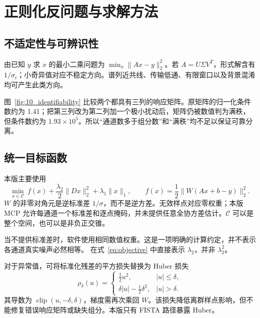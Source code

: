 \chapter{正则化反问题与求解方法}
\section{不适定性与可辨识性}
由已知 $y$ 求 $x$ 的最小二乘问题为 $\min_x\|Ax-y\|_2^2$。若 $A=U\Sigma V^T$，形式解含有 $1/\sigma_i$；小奇异值对应不稳定方向。谱列近共线、传输低通、有限窗口以及背景混淆均可产生此类方向。

图~\ref{fig:10_identifiability} 比较两个都具有三列的响应矩阵。原矩阵的归一化条件数约为 1.41；把第三列改为第二列加一个极小扰动后，矩阵仍被数值判为满秩，但条件数约为 $1.93\times10^5$。所以“通道数多于组分数”和“满秩”均不足以保证可靠分离。

\section{统一目标函数}
本版主要使用
\begin{equation}
\min_{x\in\mathcal C}\ f(x)+\frac{\lambda_2}{2}\|Dx\|_2^2+\lambda_1\|x\|_1,
\qquad f(x)=\frac12\|W(Ax+b-y)\|_2^2.\label{eq:objective}
\end{equation}
$W$ 的非零对角元是逆标准差 $1/\sigma$，而不是逆方差。无效样点对应零权重；本版 MCP 允许每通道一个标准差和逐点掩码，并未提供任意全协方差估计。$\mathcal C$ 可以是整个空间，也可以是非负正交锥。

当不提供标准差时，软件使用相同数值权重。这是一项明确的计算约定，并不表示各通道真实噪声必然相等。 在式~\eqref{eq:objective} 中直接表示 $\lambda_2$，并非 $\lambda_2^2$。

对于异常值，可将标准化残差的平方损失替换为 Huber 损失
\begin{equation}
\rho_\delta(u)=\begin{cases}\frac12u^2,&|u|\le\delta,\\
\delta|u|-\frac12\delta^2,&|u|>\delta.\end{cases}
\end{equation}
其导数为 $\operatorname{clip}(u,-\delta,\delta)$，梯度需再次乘回 $W$。该损失降低离群样点影响，但不能修复错误响应矩阵或缺失组分。本版只有 FISTA 路径暴露 Huber。

